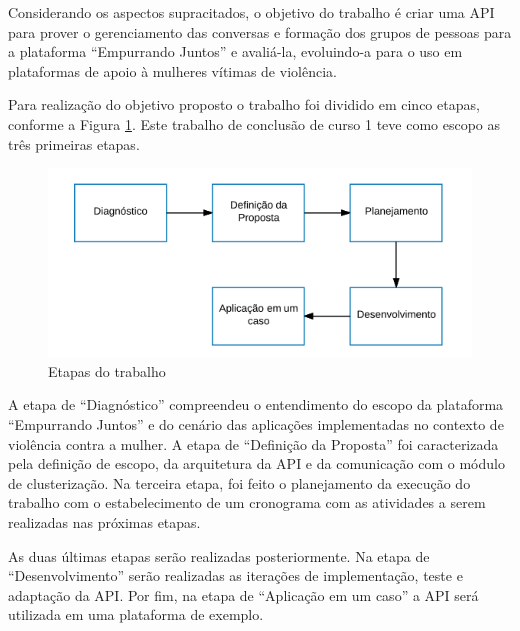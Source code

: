 Considerando os aspectos supracitados, o objetivo do trabalho é criar uma API para prover o gerenciamento das conversas e formação
dos grupos de pessoas para a plataforma ``Empurrando Juntos'' e avaliá-la, evoluindo-a para o uso em plataformas de apoio à mulheres 
vítimas de violência.



Para realização do objetivo proposto o trabalho foi dividido em cinco etapas, conforme a Figura \ref{fig:etapas_trabalho}. 
Este trabalho de conclusão de curso 1 
teve como escopo as três primeiras etapas.

\begin{figure}[h!]
\centering
\includegraphics[scale=0.6]{figuras/etapas.png}
\caption{Etapas do trabalho}
\label{fig:etapas_trabalho}
\end{figure}

A etapa de ``Diagnóstico'' compreendeu o entendimento do escopo da plataforma ``Empurrando Juntos'' e do cenário das 
aplicações implementadas no contexto de violência contra a mulher. A etapa de ``Definição da Proposta'' foi caracterizada pela definição de escopo, 
da arquitetura da API e da comunicação com o módulo de clusterização. Na terceira etapa, foi feito o planejamento da execução do trabalho com o estabelecimento
de um cronograma com as atividades a serem realizadas nas próximas etapas. 

As duas últimas etapas serão realizadas posteriormente. Na etapa de ``Desenvolvimento''
serão realizadas as iterações de implementação, teste e adaptação da API. Por fim, na etapa de ``Aplicação em um caso'' a API será utilizada em uma 
plataforma de exemplo.


